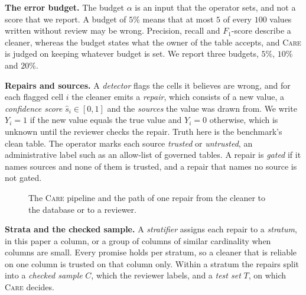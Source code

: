 \documentclass[sigconf, nonacm, balance=false]{acmart}
\theoremstyle{remark}
\begin{document}
\textbf{The error budget.} The budget $\alpha$ is an input that the operator sets, and
not a score that we report. A budget of $5\%$ means that at most $5$ of every $100$
values written without review may be wrong. Precision, recall and $F_1$-score describe a
cleaner, whereas the budget states what the owner of the table accepts, and
\textsc{Care} is judged on keeping whatever budget is set. We report three budgets,
$5\%$, $10\%$ and $20\%$.

\textbf{Repairs and sources.} A \emph{detector} flags the cells it believes are wrong,
and for each flagged cell $i$ the cleaner emits a \emph{repair}, which consists of a
new value, a \emph{confidence score} $\hat s_i\in[0,1]$ and the \emph{sources} the
value was drawn from. We write $Y_i=1$ if the new value equals the true value and
$Y_i=0$ otherwise, which is unknown until the reviewer checks the repair. Truth here is
the benchmark's clean table. The operator marks each source \emph{trusted} or
\emph{untrusted}, an administrative label such as an allow-list of governed tables. A
repair is \emph{gated} if it names sources and none of them is trusted, and a repair
that names no source is not gated.

\begin{figure}[t]
  \centering
  \resizebox{0.97\linewidth}{!}{}
  \caption{The \textsc{Care} pipeline and the path of one repair from the cleaner to
  the database or to a reviewer.}
  \label{fig:arch}
\end{figure}

\textbf{Strata and the checked sample.} A \emph{stratifier} assigns each repair to a
\emph{stratum}, in this paper a column, or a group of columns of similar cardinality
when columns are small. Every promise holds per stratum, so a cleaner that is reliable
on one column is trusted on that column only. Within a stratum the repairs split into a
\emph{checked sample} $C$, which the reviewer labels, and a \emph{test set} $T$, on
which \textsc{Care} decides.
\end{document}

